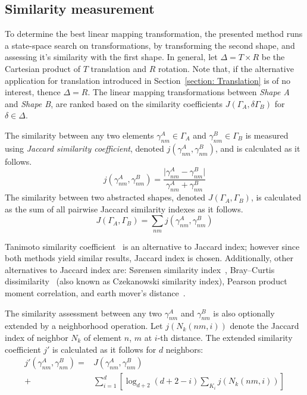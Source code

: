 \subsection{Similarity measurement} \label{section: Similarity Measurement}
To determine the best linear mapping transformation, the presented method runs a state-space search on transformations, by transforming the second shape, and assessing it's similarity with the first shape. In general, let $\Delta = T \times R$ be the Cartesian product of $T$ translation and $R$ rotation. Note that, if the alternative application for translation introduced in Section~\ref{section: Translation} is of no interest, thence $\Delta = R$. The linear mapping transformations between \textit{Shape A} and \textit{Shape B}, are ranked based on the similarity coefficients $J(\Gamma_A, \delta\Gamma_B)$ for $\delta \in \Delta$.

The similarity between any two elements $\gamma_{nm}^A \in \Gamma_A$ and $\gamma_{nm}^B \in \Gamma_B$ is measured using \textit{Jaccard similarity coefficient}, denoted $j(\gamma_{nm}^A, \gamma_{nm}^B)$, and is calculated as it follows.
\begin{equation}
j(\gamma_{nm}^A, \gamma_{nm}^B) = \frac{\vert \gamma_{nm}^A - \gamma_{nm}^B \vert}{\gamma_{nm}^A+\gamma_{nm}^B}
\end{equation}
The similarity between two abstracted shapes, denoted $J(\Gamma_A, \Gamma_B)$, is calculated as the sum of all pairwise Jaccard similarity indexes as it follows.
\begin{equation}
J(\Gamma_A, \Gamma_B) = \sum_{nm} j(\gamma_{nm}^A, \gamma_{nm}^B)
\end{equation}

Tanimoto similarity coefficient~\cite{rogers1960computer} is an alternative to Jaccard index; however since both methods yield similar results, Jaccard index is chosen. Additionally, other alternatives to Jaccard index are: S{\o}rensen similarity index~\cite{sorensen1948method}, Bray–Curtis dissimilarity~\cite{bray1957ordination} (also known as Czekanowski similarity index), Pearson product moment correlation, and earth mover's distance~\cite{rubner2000earth}.

The similarity assessment between any two $\gamma_{nm}^A$ and $\gamma_{nm}^B$ is also optionally extended by a neighborhood operation. Let $j(N_k(nm, i))$ denote the Jaccard index of neighbor $N_k$ of element $n$, $m$ at $i$-th distance. The extended similarity coefficient $j'$ is calculated as it follows for $d$ neighbors:
\begin{equation}
\begin{split}
j'(\gamma_{nm}^A, \gamma_{nm}^B) =& J(\gamma_{nm}^A, \gamma_{nm}^B)\\
+& \sum_{i=1}^{d} \left[ \log_{d+2} (d+2-i) \sum_{K_i} j(N_k(nm, i)) \right]
\end{split}
\end{equation}


